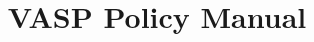 \documentclass[]{report}
\title{VASP Policy Manual}
\author{\firmfullname}
\def\firmtag{twofish}
\begin{document}
\maketitle
\tableofcontents
\newpage
\listofcrossref
\newpage
\listofstatus








\appendix


\end{document}
